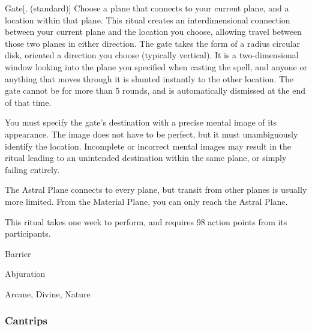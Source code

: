 \lowercase{\hypertarget{spell:Gate}{}}\label{spell:Gate}
\begin{apability}[Rank 8]{\hypertarget{spell:Gate}{Gate}}[,  (standard)]
Choose a plane that connects to your current plane, and a location within that plane.
This ritual creates an interdimensional connection between your current plane and the location you choose, allowing travel between those two planes in either direction.
The gate takes the form of a \areasmall radius circular disk, oriented a direction you choose (typically vertical).
It is a two-dimensional window looking into the plane you specified when casting the spell, and anyone or anything that moves through it is shunted instantly to the other location.
The gate cannot be  for more than 5 rounds, and is automatically dismissed at the end of that time.

You must specify the gate's destination with a precise mental image of its appearance.
The image does not have to be perfect, but it must unambiguously identify the location.
Incomplete or incorrect mental images may result in the ritual leading to an unintended destination within the same plane, or simply failing entirely.

The Astral Plane connects to every plane, but transit from other planes is usually more limited.
From the Material Plane, you can only reach the Astral Plane.

This ritual takes one week to perform, and requires 98 action points from its participants.
\end{apability}
\vspace{0.25em}


\newpage
\begin{spellsection}{Barrier}

\begin{spellheader}
\end{spellheader}


 Abjuration

 Arcane, Divine, Nature

\subsubsection{Cantrips}


\end{spellsection}


